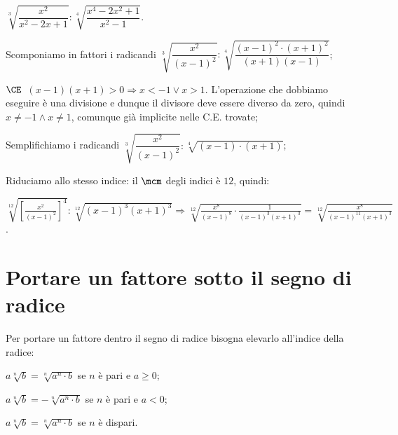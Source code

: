 \begin{exrig}
\begin{esempio}
 $\sqrt[3]{\dfrac{x^2}{x^2-2x+1}}:\sqrt[4]{\dfrac{x^4-2x^2+1}{x^2-1}}$.
\begin{enumeratea}
\item Scomponiamo in fattori i radicandi $\sqrt[3]{\dfrac{x^2}{(x-1)^2}}:\sqrt[4]{\dfrac{(x-1)^2\cdot (x+1)^2}{(x+1)(x-1)}}$;
\item $\CE$\, $(x-1)(x+1)>0\Rightarrow x<-1\vee x>1$. L'operazione che dobbiamo eseguire è una divisione e dunque il divisore deve essere diverso da zero, quindi $x\neq -1\wedge x\neq 1$, comunque già implicite nelle C.E. trovate;
\begin{center}
 
\end{center}
\item Semplifichiamo i radicandi $\sqrt[3]{\dfrac{x^2}{(x-1)^2}}:\sqrt[4]{(x-1)\cdot (x+1)}$;
\item Riduciamo allo stesso indice: il $\mcm$ degli indici è $12$, quindi:

$\sqrt[12]{\left[\frac{x^2}{(x-1)^2}\right]^4}:\sqrt[12]{(x-1)^3 (x+1)^3}\Rightarrow \sqrt[12]{\frac{x^8}{(x-1)^8}\cdot \frac 1{(x-1)^3 (x+1)^3}}=\sqrt[12]{\frac{x^8}{(x-1)^{11}(x+1)^3}}$.
\end{enumeratea}
\end{esempio}
\end{exrig}

\vspazio\ovalbox{\risolvii \ref{ese:2.32}, \ref{ese:2.33}, \ref{ese:2.34}, \ref{ese:2.35},\ref{ese:2.36},\ref{ese:2.37},\ref{ese:2.38},\ref{ese:2.39}}

\section{Portare un fattore sotto il segno di radice}
Per portare un fattore dentro il segno di radice bisogna elevarlo all’indice della radice:
\begin{itemize*}
 \item $a\sqrt[n]b=\sqrt[n]{a^n\cdot b}$ se $n$ è pari e $a\ge 0$;
 \item $a\sqrt[n]b=-\sqrt[n]{a^n\cdot b}$ se $n$ è pari e $a<0$;
 \item $a\sqrt[n]b=\sqrt[n]{a^n\cdot b}$ se $n$ è dispari.
\end{itemize*}

